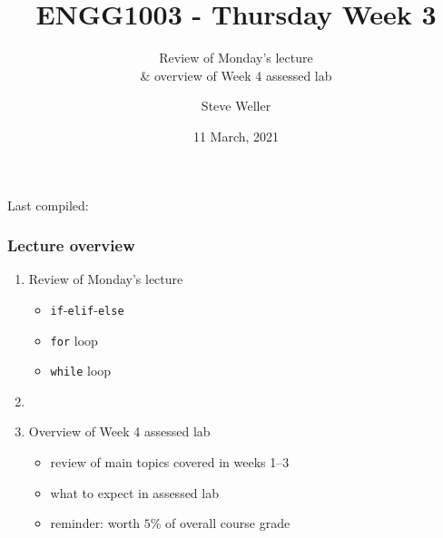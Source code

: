 \documentclass[english,14pt]{beamer}
\title{ENGG1003 - Thursday Week 3}
\subtitle{Review of Monday's lecture \\ \& overview of Week 4 assessed lab}
\author{Steve Weller}
\institute{University of Newcastle}
\date{11 March, 2021}
\begin{document}
\begin{flushleft}
{\scriptsize Last compiled:~\DTMnow}
\vspace*{-5mm}
\end{flushleft}
\framebreak


\begin{frame}[fragile]

\frametitle{Lecture overview}
\begin{enumerate}
	\item Review of Monday's lecture
		\begin{itemize}
			\item \texttt{if}-\texttt{elif}-\texttt{else} 
			\item \texttt{for} loop
			\item \texttt{while} loop
		\end{itemize}

	\item[]
	
	\item Overview of Week 4 assessed lab
	\begin{itemize}
		\item review of main topics covered in weeks 1--3
		\item what to expect in assessed lab
		\item reminder: worth $5$\% of overall course grade
	\end{itemize}	
						
\end{enumerate}

\end{frame}

\end{document}
